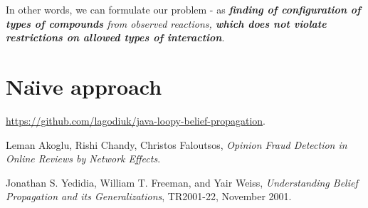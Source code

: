 \documentclass[12pt]{article}
\begin{document}
In other words, we can formulate our problem - as \textsl{\textbf{finding of configuration of types of compounds} from observed reactions, \textbf{which does not violate restrictions on allowed types of interaction}}.

\section{Na\"{\i}ve approach}


\begin{thebibliography}{9}

  \url{https://github.com/lagodiuk/java-loopy-belief-propagation}.

  Leman Akoglu, Rishi Chandy, Christos Faloutsos,
  \emph{Opinion Fraud Detection in Online Reviews by Network Effects}.

  Jonathan S. Yedidia, William T. Freeman, and Yair Weiss,
  \emph{Understanding Belief Propagation and its Generalizations},
  TR2001-22, 
  November 2001.

\end{thebibliography}
\end{document}
